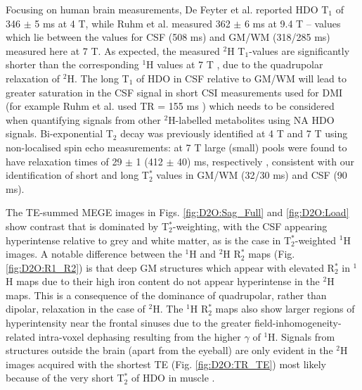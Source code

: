 Focusing on human brain measurements, De Feyter et al. \cite{DeFeyter2018DeuteriumVivo} reported HDO T$_1$ of 346 $\pm$ 5 ms at 4 T, while Ruhm et al. \cite{Ruhm2021DeuteriumResolution} measured 362 $\pm$ 6 ms at 9.4 T – values which lie between the values for \ac{CSF} (508 ms) and \ac{GM}/\ac{WM} (318/285 ms) measured here at 7 T. As expected, the measured $^2$H T$_1$-values are significantly shorter than the corresponding $^1$H values at 7 T \cite{Peters2007T27T}, due to the quadrupolar relaxation of $^2$H. The long T$_1$ of \ac{HDO} in \ac{CSF} relative to \ac{GM}/\ac{WM} will lead to greater saturation in the \ac{CSF} signal in short \ac{CSI} measurements used for \ac{DMI} (for example Ruhm et al. used TR = 155 ms \cite{Ruhm2021DeuteriumResolution}) which needs to be considered when quantifying signals from other $^2$H-labelled metabolites using \ac{NA} \ac{HDO} signals. Bi-exponential T$_2$ decay was previously identified at 4 T \cite{DeFeyter2018DeuteriumVivo} and 7 T \cite{Roig2022Deuterium7T} using non-localised spin echo measurements: at 7 T  large (small) pools were found to have relaxation times of 29 $\pm$ 1 (412 $\pm$ 40) ms, respectively \cite{Roig2022Deuterium7T}, consistent with our identification of short and long T$_2^*$ values in \ac{GM}/\ac{WM} (32/30 ms) and \ac{CSF} (90 ms). 

The \ac{TE}-summed \ac{MEGE} images in Figs. \ref{fig:D2O:Sag_Full} and \ref{fig:D2O:Load} show contrast that is dominated by T$_2^*$-weighting, with the \ac{CSF} appearing hyperintense relative to grey and white matter, as is the case in T$_2^*$-weighted $^1$H images. A notable difference between the $^1$H and $^2$H R$_2^*$ maps (Fig. \ref{fig:D2O:R1_R2}) is that deep \ac{GM} structures which appear with elevated R$_2^*$ in $^1$H maps due to their high iron content \cite{Peters2007T27T} do not appear hyperintense in the $^2$H maps. This is a consequence of the dominance of quadrupolar, rather than dipolar, relaxation in the case of $^2$H. The $^1$H R$_2^*$ maps also show larger regions of hyperintensity near the frontal sinuses due to the greater field-inhomogeneity-related intra-voxel dephasing resulting from the higher $\gamma$ of $^1$H. Signals from structures outside the brain (apart from the eyeball) are only evident in the $^2$H images acquired with the shortest \ac{TE} (Fig. \ref{fig:D2O:TR_TE}) most likely because of the very short T$_2^*$ of \ac{HDO} in muscle \cite{Gursan2022ResidualMuscle,Damion2021NaturalT}.

